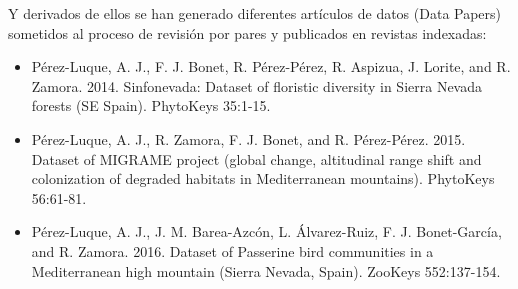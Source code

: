 Y derivados de ellos se han generado diferentes artículos de datos (Data Papers) sometidos al proceso de revisión por pares y publicados en revistas indexadas: 

\begin{itemize}
    \item Pérez-Luque, A. J., F. J. Bonet, R. Pérez-Pérez, R. Aspizua, J. Lorite, and R. Zamora. 2014. Sinfonevada: Dataset of floristic diversity in Sierra Nevada forests (SE Spain). PhytoKeys 35:1-15.
    \item Pérez-Luque, A. J., R. Zamora, F. J. Bonet, and R. Pérez-Pérez. 2015. Dataset of MIGRAME project (global change, altitudinal range shift and colonization of degraded habitats in Mediterranean mountains). PhytoKeys 56:61-81.
    \item Pérez-Luque, A. J., J. M. Barea-Azcón, L. Álvarez-Ruiz, F. J. Bonet-García, and R. Zamora. 2016. Dataset of Passerine bird communities in a Mediterranean high mountain (Sierra Nevada, Spain). ZooKeys 552:137-154.
\end{itemize}


